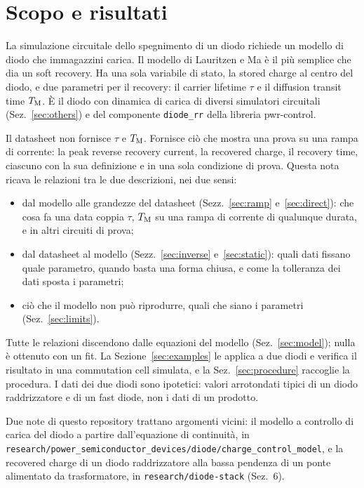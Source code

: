 \documentclass[10pt,a4paper]{scrartcl}
\let\newcommand\lmitdefine
\newcommand{\TM}{T_\mathrm{M}}
\begin{document}

\tableofcontents
\newpage

\section{Scopo e risultati}
\label{sec:scope}
La simulazione circuitale dello spegnimento di un diodo richiede un modello di diodo che immagazzini carica. Il modello di Lauritzen e Ma \cite{lauritzen1991} è il più semplice che dia un soft recovery. Ha una sola variabile di stato, la stored charge al centro del diodo, e due parametri per il recovery: il carrier lifetime $\tau$ e il diffusion transit time $\TM$. È il diodo con dinamica di carica di diversi simulatori circuitali (Sez.~\ref{sec:others}) e del componente \texttt{diode\_rr} della libreria pwr-control.

Il datasheet non fornisce $\tau$ e $\TM$. Fornisce ciò che mostra una prova su una rampa di corrente: la peak reverse recovery current, la recovered charge, il recovery time, ciascuno con la sua definizione e in una sola condizione di prova. Questa nota ricava le relazioni tra le due descrizioni, nei due sensi:
\begin{itemize}
\item dal modello alle grandezze del datasheet (Sezz.~\ref{sec:ramp} e~\ref{sec:direct}): che cosa fa una data coppia $\tau$, $\TM$ su una rampa di corrente di qualunque durata, e in altri circuiti di prova;
\item dal datasheet al modello (Sezz.~\ref{sec:inverse} e~\ref{sec:static}): quali dati fissano quale parametro, quando basta una forma chiusa, e come la tolleranza dei dati sposta i parametri;
\item ciò che il modello non può riprodurre, quali che siano i parametri (Sez.~\ref{sec:limits}).
\end{itemize}
Tutte le relazioni discendono dalle equazioni del modello (Sez.~\ref{sec:model}); nulla è ottenuto con un fit. La Sezione~\ref{sec:examples} le applica a due diodi e verifica il risultato in una commutation cell simulata, e la Sez.~\ref{sec:procedure} raccoglie la procedura. I dati dei due diodi sono ipotetici: valori arrotondati tipici di un diodo raddrizzatore e di un fast diode, non i dati di un prodotto.

Due note di questo repository trattano argomenti vicini: il modello a controllo di carica del diodo a partire dall'equazione di continuità, in \texttt{research/power\_semiconductor\_devices/diode/charge\_control\_model}, e la recovered charge di un diodo raddrizzatore alla bassa pendenza di un ponte alimentato da trasformatore, in \texttt{research/diode-stack} (Sez.~6).
\end{document}
